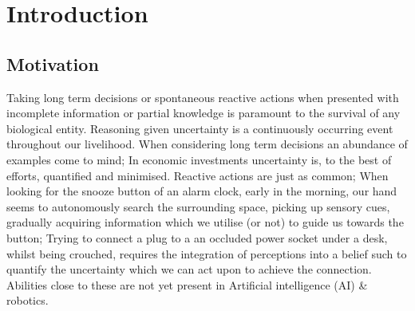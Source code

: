 \chapter{Introduction}

\section{Motivation}
% 
%
%
%
%

%
%
%
%


%
%
%
%
%
%

Taking long term decisions or spontaneous reactive actions when presented with incomplete information or partial knowledge is 
paramount to the survival of any biological entity. Reasoning given uncertainty is a continuously occurring event throughout our 
livelihood. When considering long term decisions an abundance of examples come to mind; In economic investments 
uncertainty is, to the best of efforts, quantified and minimised. Reactive actions are just as common; When looking for the snooze button of an 
alarm clock, early in the morning, our hand seems to autonomously search the surrounding space, picking up sensory cues, gradually acquiring information 
which we utilise (or not) to guide us towards the button; Trying to connect a plug to a an occluded power socket under a desk, whilst 
being crouched, requires the integration of perceptions into a belief such to quantify the uncertainty which we can act upon to 
achieve the connection. Abilities close to these are not yet present in Artificial intelligence (AI) \& robotics.


